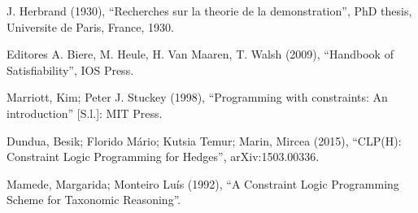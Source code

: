 \documentclass{article}
\theoremstyle{remark}
\theoremstyle{theorem}
\begin{document}
  \begin{thebibliography}{1}

      J. Herbrand (1930), ``Recherches sur la theorie de la demonstration'', PhD thesis, Universite de Paris, France, 1930.

      Editores A. Biere, M. Heule, H. Van Maaren, T. Walsh (2009), ``Handbook of Satisfiability'', IOS Press.

      Marriott, Kim; Peter J. Stuckey (1998), ``Programming with constraints: An introduction'' [S.l.]: MIT Press.

      Dundua, Besik; Florido Mário; Kutsia Temur; Marin, Mircea (2015), ``CLP(H): Constraint Logic Programming for Hedges'',  	arXiv:1503.00336.

      Mamede, Margarida; Monteiro Luís (1992), ``A Constraint Logic Programming Scheme for Taxonomic Reasoning''.

  \end{thebibliography}
\end{document}
